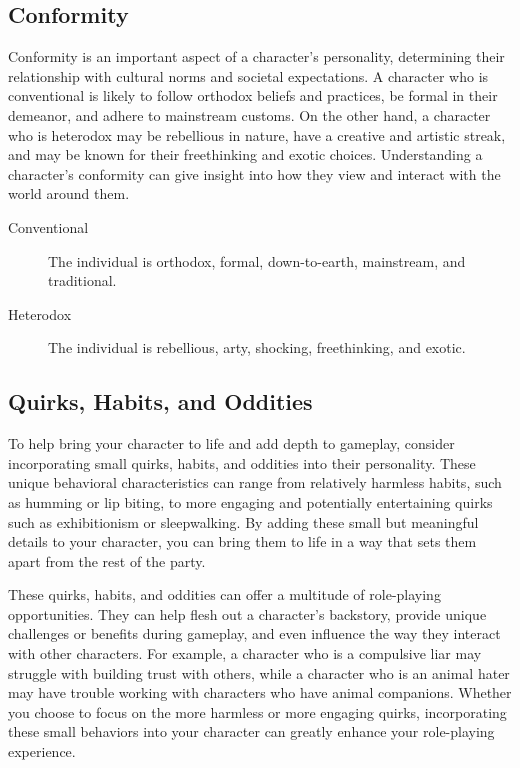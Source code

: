 \documentclass[12pt]{book}
\begin{document}
\subsection{\textbf{Conformity}}

Conformity is an important aspect of a character's personality, determining their relationship with cultural norms and societal expectations. A character who is conventional is likely to follow orthodox beliefs and practices, be formal in their demeanor, and adhere to mainstream customs. On the other hand, a character who is heterodox may be rebellious in nature, have a creative and artistic streak, and may be known for their freethinking and exotic choices. Understanding a character's conformity can give insight into how they view and interact with the world around them.

\begin{description}
    \item[Conventional] The individual is orthodox, formal, down-to-earth, mainstream, and traditional.
    \item[Heterodox] The individual is rebellious, arty, shocking, freethinking, and exotic.
\end{description}

\subsection{\textbf{Quirks, Habits, and Oddities}}

To help bring your character to life and add depth to gameplay, consider incorporating small quirks, habits, and oddities into their personality. These unique behavioral characteristics can range from relatively harmless habits, such as humming or lip biting, to more engaging and potentially entertaining quirks such as exhibitionism or sleepwalking. By adding these small but meaningful details to your character, you can bring them to life in a way that sets them apart from the rest of the party.

These quirks, habits, and oddities can offer a multitude of role-playing opportunities. They can help flesh out a character's backstory, provide unique challenges or benefits during gameplay, and even influence the way they interact with other characters. For example, a character who is a compulsive liar may struggle with building trust with others, while a character who is an animal hater may have trouble working with characters who have animal companions. Whether you choose to focus on the more harmless or more engaging quirks, incorporating these small behaviors into your character can greatly enhance your role-playing experience.
\end{document}
